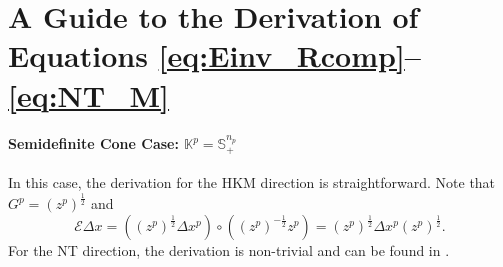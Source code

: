 \section{A Guide to the Derivation of Equations \eqref{eq:Einv_Rcomp}--\eqref{eq:NT_M}} \label{sec:guide_for_dir_eq}

\paragraph{Semidefinite Cone Case: $\mathbb{K}^p=\mathbb{S}_+^{n_p}$}
In this case, the derivation for the HKM direction is straightforward. Note that $G^p=(z^p)^\frac{1}{2}$ and 
\begin{equation*}
\mathcal{E}\Delta x = ((z^p)^\frac{1}{2}\Delta x^p)\circ ((z^p)^{-\frac{1}{2}}z^p)=(z^p)^\frac{1}{2} \Delta x^p (z^p)^\frac{1}{2}.
\end{equation*}
For the NT direction, the derivation is non-trivial and can be found in \cite{todd1998}.

